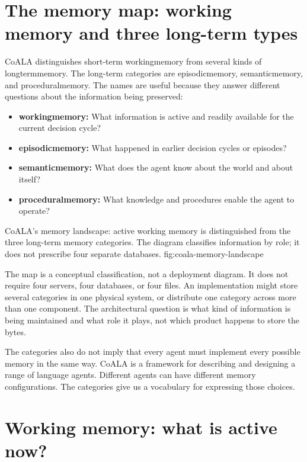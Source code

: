 \section{The memory map: working memory and three long-term types}
\label{sec:coala-memory-map}

CoALA distinguishes short-term \gls{workingmemory} from several kinds of \gls{longtermmemory}. The long-term categories are \gls{episodicmemory}, \gls{semanticmemory}, and \gls{proceduralmemory}. The names are useful because they answer different questions about the information being preserved:

\begin{itemize}
  \item \textbf{\gls{workingmemory}:} What information is active and readily available for the current decision cycle?
  \item \textbf{\gls{episodicmemory}:} What happened in earlier decision cycles or episodes?
  \item \textbf{\gls{semanticmemory}:} What does the agent know about the world and about itself?
  \item \textbf{\gls{proceduralmemory}:} What knowledge and procedures enable the agent to operate?
\end{itemize}

  {CoALA's memory landscape: active working memory is distinguished from the three long-term memory categories. The diagram classifies information by role; it does not prescribe four separate databases.}
  {fig:coala-memory-landscape}

The map is a conceptual classification, not a deployment diagram. It does not require four servers, four databases, or four files. An implementation might store several categories in one physical system, or distribute one category across more than one component. The architectural question is what kind of information is being maintained and what role it plays, not which product happens to store the bytes.

The categories also do not imply that every agent must implement every possible memory in the same way. CoALA is a framework for describing and designing a range of language agents. Different agents can have different memory configurations. The categories give us a vocabulary for expressing those choices.

\section{Working memory: what is active now?}
\label{sec:working-memory}

